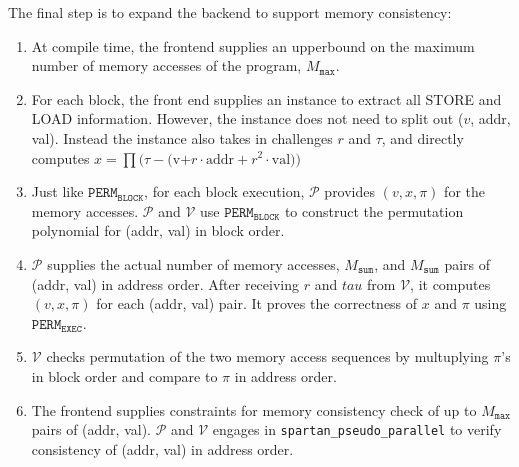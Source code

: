\documentclass{article}
\newcommand{\code}{\texttt}
\newcommand{\Msum}{M_{\mathtt{sum}}}
\newcommand{\Mmax}{M_{\mathtt{max}}}
\renewcommand{\P}{\mathcal{P}}
\newcommand{\V}{\mathcal{V}}
\newcommand{\PERMB}{\mathtt{PERM_{BLOCK}}}
\newcommand{\PERME}{\mathtt{PERM_{EXEC}}}
\begin{document}
The final step is to expand the backend to support memory consistency:
\begin{enumerate}
    \item At compile time, the frontend supplies an upperbound on the maximum number of memory accesses of the program, $\Mmax$.
    \item For each block, the front end supplies an instance to extract all STORE and LOAD information. However, the instance does not need to split out ($v$, addr, val). Instead the instance also takes in challenges $r$ and $\tau$, and directly computes $x = \prod (\tau - ($v$ + r\cdot \mbox{addr} + r^2 \cdot \mbox{val}))$
    \item Just like $\PERMB$, for each block execution, $\P$ provides $(v, x, \pi)$ for the memory accesses. $\P$ and $\V$ use $\PERMB$ to construct the permutation polynomial for (addr, val) in block order.
    \item $\P$ supplies the actual number of memory accesses, $\Msum$, and $\Msum$ pairs of (addr, val) in address order. After receiving $r$ and $tau$ from $\V$, it computes $(v, x, \pi)$ for each (addr, val) pair. It proves the correctness of $x$ and $\pi$ using $\PERME$.
    \item $\V$ checks permutation of the two memory access sequences by multuplying $\pi$'s in block order and compare to $\pi$ in address order.
    \item The frontend supplies constraints for memory consistency check of up to $\Mmax$ pairs of (addr, val). $\P$ and $\V$ engages in \code{spartan\_pseudo\_parallel} to verify consistency of (addr, val) in address order.
\end{enumerate}
\end{document}
